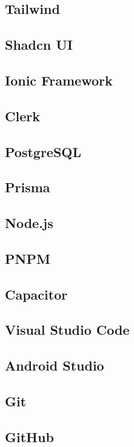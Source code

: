 \subsection{Tailwind}

\subsection{Shadcn UI}

\subsection{Ionic Framework}

\subsection{Clerk}

\subsection{PostgreSQL}

\subsection{Prisma}

\subsection{Node.js}

\subsection{PNPM}

\subsection{Capacitor}

\subsection{Visual Studio Code}

\subsection{Android Studio}

\subsection{Git}

\subsection{GitHub}
